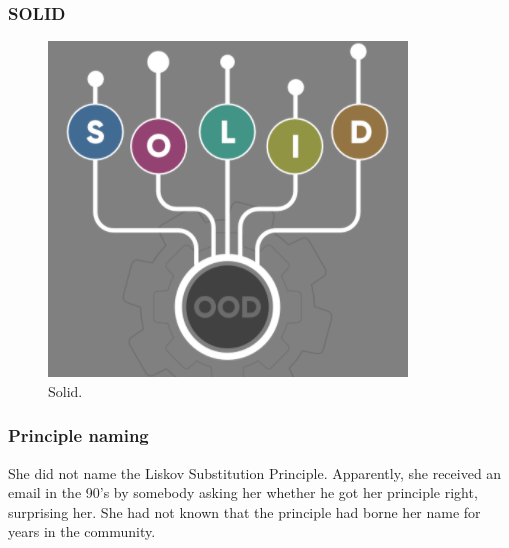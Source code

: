 \documentclass{beamer}
\begin{document}
\begin{frame}
\frametitle{SOLID} 
\begin{figure}[h]
\centering
\includegraphics[scale=0.8]{SOLID}
\caption{Solid.}

\label{fig: pic2}

\end{figure}

\end{frame}


\begin{frame}
\frametitle{Principle naming}
She did not name the Liskov Substitution Principle. Apparently, she received an email in the 90’s by somebody asking her whether he got her principle right, surprising her. She had not known that the principle had borne her name for years in the community.
\end{frame}
\end{document}
